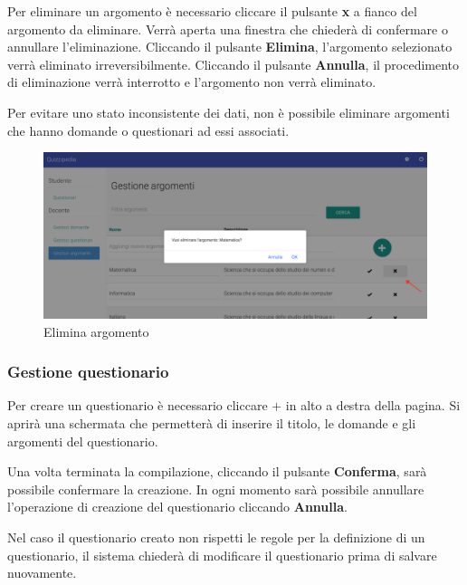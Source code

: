 \documentclass[12pt,a4paper]{article}
\begin{document}
		\par Per eliminare un argomento è necessario cliccare il pulsante \textbf{x} a fianco del argomento da eliminare.
		Verrà aperta una finestra che chiederà di confermare o annullare l'eliminazione. Cliccando il pulsante \textbf{Elimina}, l'argomento selezionato verrà eliminato irreversibilmente. Cliccando il pulsante \textbf{Annulla}, il procedimento di eliminazione verrà interrotto e l'argomento non verrà eliminato. \\
		\par Per evitare uno stato inconsistente dei dati, non è possibile eliminare argomenti che hanno domande o questionari ad essi associati. \\
		
			\begin{figure}[H]	
				\centering
				\includegraphics[width=1.0\linewidth]{../img/screenshot/eliminaArgomento.png}
				\caption{Elimina argomento}
				\label{Elimina argomento}
			\end{figure}
		
		\subsubsection{Gestione questionario}
		\par Per creare un questionario è necessario cliccare $\boldsymbol{+}$ in alto a destra della pagina. Si aprirà una schermata che permetterà di inserire il titolo, le domande e gli argomenti del questionario. \\
		\par Una volta terminata la compilazione, cliccando il pulsante \textbf{Conferma}, sarà possibile confermare la creazione. 
		In ogni momento sarà possibile annullare l'operazione di creazione del questionario cliccando \textbf{Annulla}.
		
		\par Nel caso il questionario creato non rispetti le regole per la definizione di un questionario, il sistema chiederà di modificare il questionario prima di salvare nuovamente. \\
		
\end{document}
